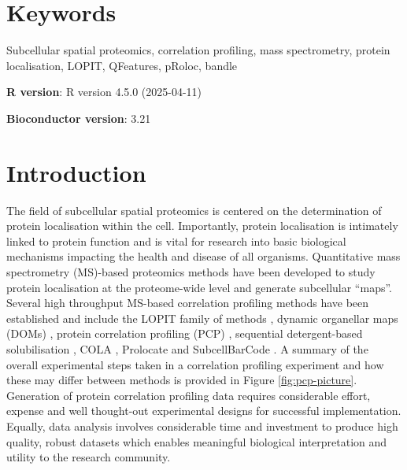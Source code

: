 \documentclass[9pt,a4paper,]{extarticle}
\begin{document}
\section*{Keywords}
Subcellular spatial proteomics, correlation profiling, mass spectrometry, protein localisation,
LOPIT, QFeatures, pRoloc, bandle


\clearpage
\pagestyle{main}

\textbf{R version}: R version 4.5.0 (2025-04-11)

\textbf{Bioconductor version}: 3.21

\section{Introduction}\label{introduction}

The field of subcellular spatial proteomics is centered on the determination of protein
localisation within the cell. Importantly, protein localisation is
intimately linked to protein function and is vital for research into basic
biological mechanisms impacting the health and disease of all organisms. Quantitative mass
spectrometry (MS)-based proteomics methods have been developed to study protein
localisation at the proteome-wide level and generate subcellular ``maps''.
Several high throughput MS-based correlation profiling methods have been
established and include the LOPIT family of methods \citep{Sadowski2006, Geladaki2019, Christoforou2016},
dynamic organellar maps (DOMs) \citep{Itzhak2016}, protein correlation profiling (PCP) \citep{Foster2006},
sequential detergent-based solubilisation \citep{MartinezVal2021}, COLA \citep{Mardakheh2017},
Prolocate \citep{Jadot2017} and SubcellBarCode \citep{Orre2019}. A summary of the overall
experimental steps taken in a correlation profiling experiment and how these may
differ between methods is provided in Figure \ref{fig:pcp-picture}. Generation of
protein correlation profiling data requires considerable effort, expense and well
thought-out experimental designs for successful implementation. Equally, data
analysis involves considerable time and investment to produce high quality,
robust datasets which enables meaningful biological interpretation and utility to
the research community.
\end{document}
